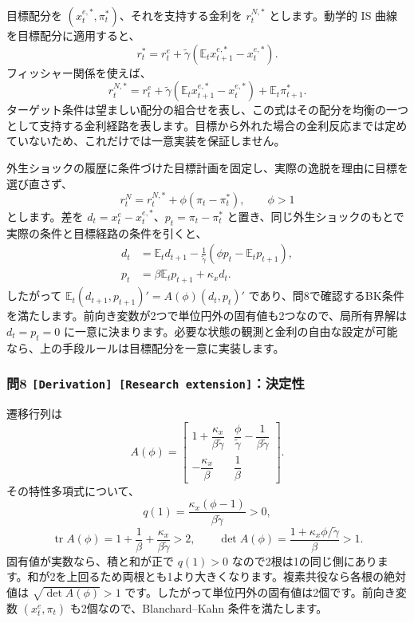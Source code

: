 \documentclass[
  japanese,
  lualatex,
  ja=standard,
  11pt,
  a4paper]{ltjsarticle}
\begin{document}
目標配分を \((x_t^{e,*},\pi_t^*)\)、それを支持する金利を \(r_t^{N,*}\)
とします。動学的 IS 曲線を目標配分に適用すると、 \[
r_t^*=r_t^e+\widetilde\gamma
\left(\mathbb E_tx_{t+1}^{e,*}-x_t^{e,*}\right).
\] フィッシャー関係を使えば、 \[
r_t^{N,*}
=r_t^e+\widetilde\gamma
\left(\mathbb E_tx_{t+1}^{e,*}-x_t^{e,*}\right)
+\mathbb E_t\pi_{t+1}^*.
\]
ターゲット条件は望ましい配分の組合せを表し、この式はその配分を均衡の一つとして支持する金利経路を表します。目標から外れた場合の金利反応までは定めていないため、これだけでは一意実装を保証しません。

外生ショックの履歴に条件づけた目標計画を固定し、実際の逸脱を理由に目標を選び直さず、
\[
r_t^N=r_t^{N,*}+\phi(\pi_t-\pi_t^*),
\qquad\phi>1
\] とします。差を \(d_t=x_t^e-x_t^{e,*}\)、\(p_t=\pi_t-\pi_t^*\)
と置き、同じ外生ショックのもとで実際の条件と目標経路の条件を引くと、 \[
\begin{aligned}
d_t&=\mathbb E_td_{t+1}
-\frac1{\widetilde\gamma}
\left(\phi p_t-\mathbb E_tp_{t+1}\right),\\
p_t&=\beta\mathbb E_tp_{t+1}+\kappa_xd_t.
\end{aligned}
\] したがって \(\mathbb E_t(d_{t+1},p_{t+1})'=A(\phi)(d_t,p_t)'\)
であり、問8で確認するBK条件を満たします。前向き変数が2つで単位円外の固有値も2つなので、局所有界解は
\(d_t=p_t=0\)
に一意に決まります。必要な状態の観測と金利の自由な設定が可能なら、上の手段ルールは目標配分を一意に実装します。

\subsubsection{\texorpdfstring{問8
\texttt{{[}Derivation{]}\ {[}Research\ extension{]}}：決定性}{問8 {[}Derivation{]} {[}Research extension{]}：決定性}}\label{ux554f8-derivation-research-extensionux6c7aux5b9aux6027}

遷移行列は \[
A(\phi)=
\begin{bmatrix}
1+\dfrac{\kappa_x}{\beta\widetilde\gamma}
&\dfrac{\phi}{\widetilde\gamma}-\dfrac{1}{\beta\widetilde\gamma}\\
-\dfrac{\kappa_x}{\beta}&\dfrac1\beta
\end{bmatrix}.
\] その特性多項式について、 \[
q(1)=\frac{\kappa_x(\phi-1)}{\beta\widetilde\gamma}>0,
\] \[
\operatorname{tr}A(\phi)
=1+\frac1\beta+\frac{\kappa_x}{\beta\widetilde\gamma}>2,
\qquad
\det A(\phi)=\frac{1+\kappa_x\phi/\widetilde\gamma}{\beta}>1.
\] 固有値が実数なら、積と和が正で \(q(1)>0\)
なので2根は1の同じ側にあります。和が2を上回るため両根とも1より大きくなります。複素共役なら各根の絶対値は
\(\sqrt{\det A(\phi)}>1\)
です。したがって単位円外の固有値は2個です。前向き変数 \((x_t^e,\pi_t)\)
も2個なので、Blanchard--Kahn 条件を満たします。
\end{document}
